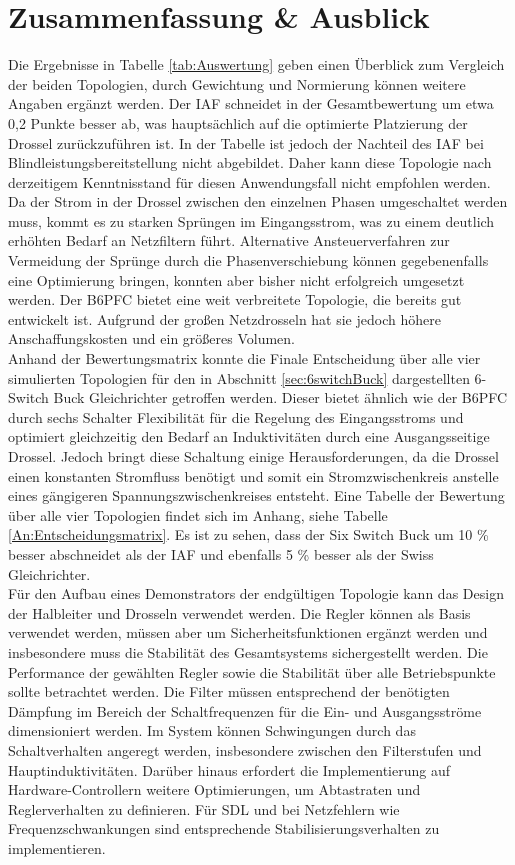 \chapter{Zusammenfassung \& Ausblick}
Die Ergebnisse in Tabelle \ref{tab:Auswertung} geben einen Überblick zum Vergleich der beiden Topologien, durch Gewichtung und Normierung können weitere Angaben ergänzt werden. Der \gls{IAF} schneidet in der Gesamtbewertung um etwa 0,2 Punkte besser ab, was hauptsächlich auf die optimierte Platzierung der Drossel zurückzuführen ist. In der Tabelle ist jedoch der Nachteil des \gls{IAF} bei Blindleistungsbereitstellung nicht abgebildet. Daher kann diese Topologie nach derzeitigem Kenntnisstand für diesen Anwendungsfall nicht empfohlen werden. Da der Strom in der Drossel zwischen den einzelnen Phasen umgeschaltet werden muss, kommt es zu starken Sprüngen im Eingangsstrom, was zu einem deutlich erhöhten Bedarf an Netzfiltern führt. Alternative Ansteuerverfahren zur Vermeidung der Sprünge durch die Phasenverschiebung können gegebenenfalls eine Optimierung bringen, konnten aber bisher nicht erfolgreich umgesetzt werden. Der \gls{B6PFC} bietet eine weit verbreitete Topologie, die bereits gut entwickelt ist. Aufgrund der großen Netzdrosseln hat sie jedoch höhere Anschaffungskosten und ein größeres Volumen. \\ 
Anhand der Bewertungsmatrix konnte die Finale Entscheidung über alle vier simulierten Topologien für den in Abschnitt \ref{sec:6switchBuck} dargestellten 6-Switch Buck Gleichrichter getroffen werden. Dieser bietet ähnlich wie der \gls{B6PFC} durch sechs Schalter Flexibilität für die Regelung des Eingangsstroms und optimiert gleichzeitig den Bedarf an Induktivitäten durch eine Ausgangsseitige Drossel. Jedoch bringt diese Schaltung einige Herausforderungen, da die Drossel einen konstanten Stromfluss benötigt und somit ein Stromzwischenkreis anstelle eines gängigeren Spannungszwischenkreises entsteht. Eine Tabelle der Bewertung über alle vier Topologien findet sich im Anhang, siehe Tabelle \ref{An:Entscheidungsmatrix}. Es ist zu sehen, dass der Six Switch Buck um 10 \% besser abschneidet als der \gls{IAF} und ebenfalls 5 \% besser als der Swiss Gleichrichter. \\
Für den Aufbau eines Demonstrators der endgültigen Topologie kann das Design der Halbleiter und Drosseln verwendet werden. Die Regler können als Basis verwendet werden, müssen aber um Sicherheitsfunktionen ergänzt werden und insbesondere muss die Stabilität des Gesamtsystems sichergestellt werden. Die Performance der gewählten Regler sowie die Stabilität über alle Betriebspunkte sollte betrachtet werden. Die Filter müssen entsprechend der benötigten Dämpfung im Bereich der Schaltfrequenzen für die Ein- und Ausgangsströme dimensioniert werden. Im System können Schwingungen durch das Schaltverhalten angeregt werden, insbesondere zwischen den Filterstufen und Hauptinduktivitäten. Darüber hinaus erfordert die Implementierung auf Hardware-Controllern weitere Optimierungen, um Abtastraten und Reglerverhalten zu definieren. Für \gls{SDL} und bei Netzfehlern wie Frequenzschwankungen sind entsprechende Stabilisierungsverhalten zu implementieren.\\

